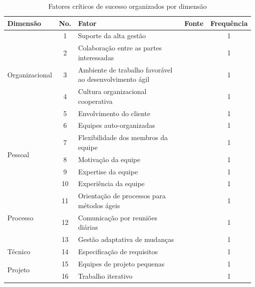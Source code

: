 \documentclass[sigconf]{acmart}
\begin{document}
\begin{table}[t]
\centering
\setcounter{table}{10}
\caption{Fatores críticos de sucesso organizados por dimensão}
\label{tab:fatores_criticos_ape}
\begin{tabular}{p{2.6cm} c p{8cm} c c}
\toprule
\textbf{Dimensão} & \textbf{No.} & \textbf{Fator} & \textbf{Fonte} & \textbf{Frequência} \\
\midrule
\multirow{5}{2.6cm}{Organizacional}
 & 1  & Suporte da alta gestão                                  & \cite{Junior:2024}   & 1 \\
 & 2  & Colaboração entre as partes interessadas                & \cite{Chaves:2020}   & 1 \\
 & 3  & Ambiente de trabalho favorável ao desenvolvimento ágil  & \cite{Junior:2024}   & 1 \\
 & 4  & Cultura organizacional cooperativa                      & \cite{Junior:2024}   & 1 \\
 & 5  & Envolvimento do cliente                                 & \cite{Junior:2024}   & 1 \\
\multirow{5}{2.6cm}{Pessoal}
 & 6  & Equipes auto-organizadas                                & \cite{Junior:2024}   & 1 \\
 & 7  & Flexibilidade dos membros da equipe                     & \cite{Junior:2024}   & 1 \\
 & 8  & Motivação da equipe                                     & \cite{Junior:2024}   & 1 \\
 & 9  & Expertise da equipe                                     & \cite{Junior:2024}   & 1 \\
 & 10 & Experiência da equipe                                   & \cite{Junior:2024}   & 1 \\
\multirow{3}{2.6cm}{Processo}
 & 11 & Orientação de processos para métodos ágeis              & \cite{Junior:2024}   & 1 \\
 & 12 & Comunicação por reuniões diárias                        & \cite{Junior:2024}   & 1 \\
 & 13 & Gestão adaptativa de mudanças                           & \cite{Junior:2024}   & 1 \\
Técnico
 & 14 & Especificação de requisitos                             & \cite{Ilays:2024}    & 1 \\
\multirow{7}{2.6cm}{Projeto}
 & 15 & Equipes de projeto pequenas                             & \cite{Junior:2024}   & 1 \\
 & 16 & Trabalho iterativo                                      & \cite{Junior:2024}   & 1 \\

\end{tabular}
\end{table}
\end{document}
